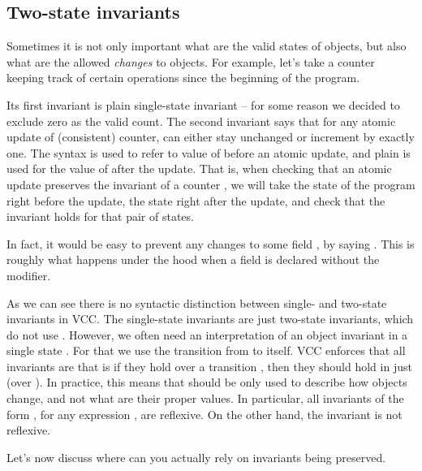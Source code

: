 \subsection{Two-state invariants}

Sometimes it is not only important what are the valid states of objects,
but also what are the allowed \emph{changes} to objects.
For example, let's take a counter keeping track of certain operations
since the beginning of the program.


\noindent
Its first invariant is plain single-state invariant -- for some reason
we decided to exclude zero as the valid count.
The second invariant says that for any atomic update of (consistent)
counter,  can either stay unchanged or increment by exactly one.
The syntax  is used to refer to value of  before
an atomic update, and plain  is used for the value of 
after the update.
That is, when checking that an atomic update preserves the invariant
of a counter , we will take the state of the program right
before the update, the state right after the update, and check
that the invariant holds for that pair of states.

\begin{note}
In fact, it would be easy to prevent any changes to some field , by
saying .
This is roughly what happens under the hood when a field is
declared without the  modifier.
\end{note}

As we can see there is no syntactic distinction between single-
and two-state invariants in VCC.
The single-state invariants are just two-state invariants, which do not use
.
However, we often need an interpretation of an object invariant in a single state .
For that we use the  transition from  to  itself.
VCC enforces that all invariants are  that is if they hold
over a transition , then they should hold in just 
(\ie over ).
In practice,
this means that  should be only used to describe
how objects change, and not what are their proper values.
In particular,
all invariants of the form , for any expression , are reflexive.
On the other hand, the invariant  is not reflexive.

Let's now discuss where can you actually rely on invariants being preserved.

